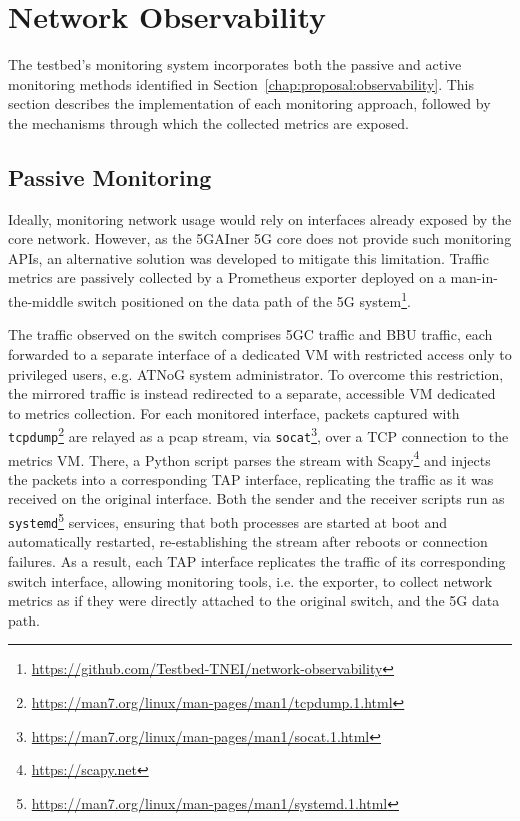 \section{Network Observability}
\label{chap:impl:observability}

The testbed's monitoring system incorporates both the passive and active monitoring methods identified in Section~\ref{chap:proposal:observability}. This section describes the implementation of each monitoring approach, followed by the mechanisms through which the collected metrics are exposed.

\subsection{Passive Monitoring}
\label{chap:impl:observability:passive}

Ideally, monitoring network usage would rely on interfaces already exposed by the core network. However, as the 5GAIner \acs{5G} core does not provide such monitoring \acsp{API}, an alternative solution was developed to mitigate this limitation. Traffic metrics are passively collected by a Prometheus exporter deployed on a man-in-the-middle switch positioned on the data path of the \acs{5G} system\footnote{\url{https://github.com/Testbed-TNEI/network-observability}}.

The traffic observed on the switch comprises \acs{5GC} traffic and \acs{BBU} traffic, each forwarded to a separate interface of a dedicated \acs{VM} with restricted access only to privileged users, e.g. \acs{ATNoG} system administrator. To overcome this restriction, the mirrored traffic is instead redirected to a separate, accessible \acs{VM} dedicated to metrics collection. For each monitored interface, packets captured with \texttt{tcpdump}\footnote{\url{https://man7.org/linux/man-pages/man1/tcpdump.1.html}} are relayed as a pcap stream, via \texttt{socat}\footnote{\url{https://man7.org/linux/man-pages/man1/socat.1.html}}, over a \acs{TCP} connection to the metrics \acs{VM}. There, a Python script parses the stream with Scapy\footnote{\url{https://scapy.net}} and injects the packets into a corresponding \acs{TAP} interface, replicating the traffic as it was received on the original interface. Both the sender and the receiver scripts run as \texttt{systemd}\footnote{\url{https://man7.org/linux/man-pages/man1/systemd.1.html}} services, ensuring that both processes are started at boot and automatically restarted, re-establishing the stream after reboots or connection failures. As a result, each  \acs{TAP} interface replicates the traffic of its corresponding switch interface, allowing monitoring tools, i.e. the exporter, to collect network metrics as if they were directly attached to the original switch, and the \acs{5G} data path.

